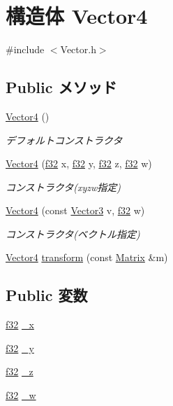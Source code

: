 \hypertarget{struct_vector4}{\section{構造体 Vector4}
\label{struct_vector4}
}


{\ttfamily \#include $<$Vector.\-h$>$}

\subsection*{Public メソッド}
\begin{DoxyCompactItemize}
\item 
\hyperlink{struct_vector4_a511b4d9c8326c235b76d794eea018921}{Vector4} ()
\begin{DoxyCompactList}\small\item\em デフォルトコンストラクタ \end{DoxyCompactList}\item 
\hyperlink{struct_vector4_af392697118abd888bc7aa1781cd08eb9}{Vector4} (\hyperlink{_main_8h_a5f6906312a689f27d70e9d086649d3fd}{f32} x, \hyperlink{_main_8h_a5f6906312a689f27d70e9d086649d3fd}{f32} y, \hyperlink{_main_8h_a5f6906312a689f27d70e9d086649d3fd}{f32} z, \hyperlink{_main_8h_a5f6906312a689f27d70e9d086649d3fd}{f32} w)
\begin{DoxyCompactList}\small\item\em コンストラクタ(xyzw指定) \end{DoxyCompactList}\item 
\hyperlink{struct_vector4_a0bbfb6f21d73c847d5bd57e491388c1e}{Vector4} (const \hyperlink{struct_vector3}{Vector3} v, \hyperlink{_main_8h_a5f6906312a689f27d70e9d086649d3fd}{f32} w)
\begin{DoxyCompactList}\small\item\em コンストラクタ(ベクトル指定) \end{DoxyCompactList}\item 
\hyperlink{struct_vector4}{Vector4} \hyperlink{struct_vector4_a55b17f5f4003a2c1b46066925b072635}{transform} (const \hyperlink{struct_matrix}{Matrix} \&m)
\end{DoxyCompactItemize}
\subsection*{Public 変数}
\begin{DoxyCompactItemize}
\item 
\hyperlink{_main_8h_a5f6906312a689f27d70e9d086649d3fd}{f32} \hyperlink{struct_vector4_abb21125aa7a06ea4437281aa76a551ea}{\-\_\-x}
\item 
\hyperlink{_main_8h_a5f6906312a689f27d70e9d086649d3fd}{f32} \hyperlink{struct_vector4_ad9ed5b3fc455babdf07b04b25a8e9ba7}{\-\_\-y}
\item 
\hyperlink{_main_8h_a5f6906312a689f27d70e9d086649d3fd}{f32} \hyperlink{struct_vector4_a96640816e4ce903c77e79f896b4331bd}{\-\_\-z}
\item 
\hyperlink{_main_8h_a5f6906312a689f27d70e9d086649d3fd}{f32} \hyperlink{struct_vector4_a9aae8a768968c7939492dcc8277dab19}{\-\_\-w}
\end{DoxyCompactItemize}


